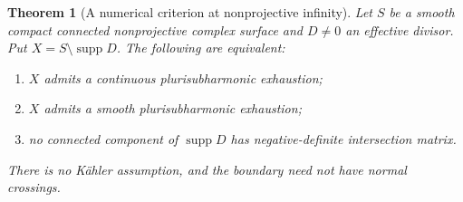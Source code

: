 \documentclass[11pt]{amsart}
\newtheorem{theorem}{Theorem}[section]
\theoremstyle{definition}
\theoremstyle{remark}
\numberwithin{equation}{section}
\newcommand{\supp}{\operatorname{supp}}
\begin{document}
\begin{theorem}[A numerical criterion at nonprojective infinity]
\label{thm:nonprojective}
Let $S$ be a smooth compact connected nonprojective complex surface and $D\ne0$ an effective
divisor. Put $X=S\setminus\supp D$. The following are equivalent:
\begin{enumerate}[label=\textup{(\roman*)},leftmargin=2.5em]
\item $X$ admits a continuous plurisubharmonic exhaustion;
\item $X$ admits a smooth plurisubharmonic exhaustion;
\item no connected component of $\supp D$ has negative-definite intersection matrix.
\end{enumerate}
There is no K\"ahler assumption, and the boundary need not have normal crossings.
\end{theorem}
\end{document}
